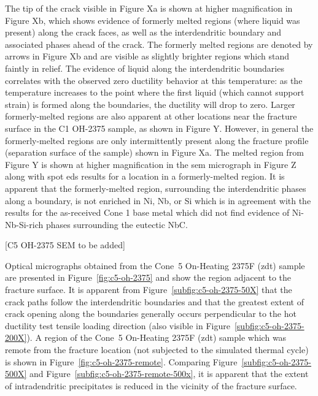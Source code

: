 The tip of the crack visible in Figure Xa is shown at higher magnification in Figure Xb, which shows evidence of formerly melted regions (where liquid was present) along the crack faces, as well as the interdendritic boundary and associated phases ahead of the crack. The formerly melted regions are denoted by arrows in Figure Xb and are visible as slightly brighter regions which stand faintly in relief. The evidence of liquid along the interdendritic boundaries correlates with the observed zero ductility behavior at this temperature: as the temperature increases to the point where the first liquid (which cannot support strain) is formed along the boundaries, the ductility will drop to zero. Larger formerly-melted regions are also apparent at other locations near the fracture surface in the C1 OH-2375 sample, as shown in Figure Y. However, in general the formerly-melted regions are only intermittently present along the fracture profile (separation surface of the sample) shown in Figure Xa. The melted region from Figure Y is shown at higher magnification in the \gls{sem} micrograph in Figure Z along with spot \gls{eds} results for a location in a formerly-melted region. It is apparent that the formerly-melted region, surrounding the interdendritic phases along a boundary, is not enriched in Ni, Nb, or Si which is in agreement with the results for the as-received Cone 1 base metal which did not find evidence of Ni-Nb-Si-rich phases surrounding the eutectic NbC.




[C5 OH-2375 SEM to be added]















Optical micrographs obtained from the Cone~5 On-Heating 2375\textdegree{}F (\gls{zdt}) sample are presented in Figure~\ref{fig:c5-oh-2375} and show the region adjacent to the fracture surface.  It is apparent from Figure~\ref{subfig:c5-oh-2375-50X} that the crack paths follow the interdendritic boundaries and that the greatest extent of crack opening along the boundaries generally occurs perpendicular to the hot ductility test tensile loading direction (also visible in Figure~\ref{subfig:c5-oh-2375-200X}).  A region of the Cone~5 On-Heating 2375\textdegree{}F (\gls{zdt}) sample which was remote from the fracture location (not subjected to the simulated thermal cycle) is shown in Figure~\ref{fig:c5-oh-2375-remote}.  Comparing Figure~\ref{subfig:c5-oh-2375-500X} and Figure~\ref{subfig:c5-oh-2375-remote-500x}, it is apparent that the extent of intradendritic precipitates is reduced in the vicinity of the fracture surface.


